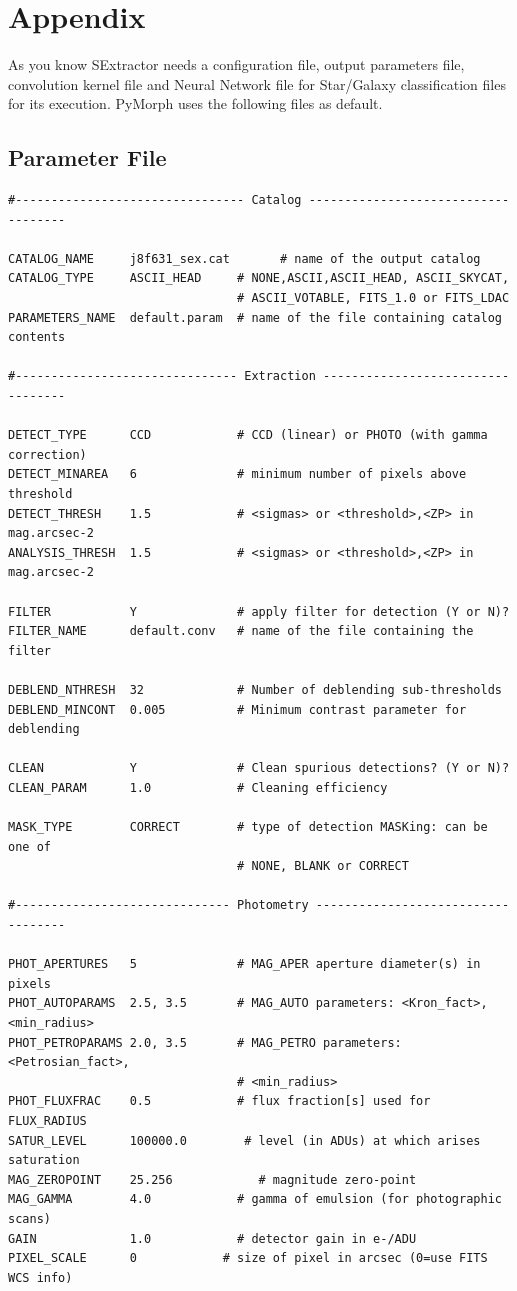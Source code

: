 \documentclass[a4paper,12pt]{article}
\begin{document}
\section{Appendix}
As you know SExtractor needs a configuration file, output parameters file, convolution kernel file and Neural Network file for Star/Galaxy classification files for its execution. 
PyMorph uses the following files as default.
\subsection{Parameter File}
\begin{footnotesize}
\begin{verbatim}
#-------------------------------- Catalog ------------------------------------
 
CATALOG_NAME     j8f631_sex.cat       # name of the output catalog
CATALOG_TYPE     ASCII_HEAD     # NONE,ASCII,ASCII_HEAD, ASCII_SKYCAT,
                                # ASCII_VOTABLE, FITS_1.0 or FITS_LDAC
PARAMETERS_NAME  default.param  # name of the file containing catalog contents
 
#------------------------------- Extraction ----------------------------------
 
DETECT_TYPE      CCD            # CCD (linear) or PHOTO (with gamma correction)
DETECT_MINAREA   6              # minimum number of pixels above threshold
DETECT_THRESH    1.5            # <sigmas> or <threshold>,<ZP> in mag.arcsec-2
ANALYSIS_THRESH  1.5            # <sigmas> or <threshold>,<ZP> in mag.arcsec-2
 
FILTER           Y              # apply filter for detection (Y or N)?
FILTER_NAME      default.conv   # name of the file containing the filter
 
DEBLEND_NTHRESH  32             # Number of deblending sub-thresholds
DEBLEND_MINCONT  0.005          # Minimum contrast parameter for deblending
 
CLEAN            Y              # Clean spurious detections? (Y or N)?
CLEAN_PARAM      1.0            # Cleaning efficiency
 
MASK_TYPE        CORRECT        # type of detection MASKing: can be one of
                                # NONE, BLANK or CORRECT
 
#------------------------------ Photometry -----------------------------------
 
PHOT_APERTURES   5              # MAG_APER aperture diameter(s) in pixels
PHOT_AUTOPARAMS  2.5, 3.5       # MAG_AUTO parameters: <Kron_fact>,<min_radius>
PHOT_PETROPARAMS 2.0, 3.5       # MAG_PETRO parameters: <Petrosian_fact>,
                                # <min_radius>
PHOT_FLUXFRAC    0.5            # flux fraction[s] used for FLUX_RADIUS
SATUR_LEVEL      100000.0        # level (in ADUs) at which arises saturation
MAG_ZEROPOINT    25.256            # magnitude zero-point
MAG_GAMMA        4.0            # gamma of emulsion (for photographic scans)
GAIN             1.0            # detector gain in e-/ADU
PIXEL_SCALE      0            # size of pixel in arcsec (0=use FITS WCS info)
 

\end{verbatim}
\end{footnotesize}
\end{document}
